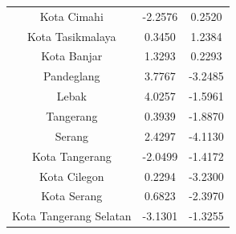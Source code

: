 \begin{longtable}{|c|c|c|}
Kota Cimahi & -2.2576 & 0.2520 \\
Kota Tasikmalaya & 0.3450 & 1.2384 \\
Kota Banjar & 1.3293 & 0.2293 \\
Pandeglang & 3.7767 & -3.2485 \\
Lebak & 4.0257 & -1.5961 \\
Tangerang & 0.3939 & -1.8870 \\
Serang & 2.4297 & -4.1130 \\
Kota Tangerang & -2.0499 & -1.4172 \\
Kota Cilegon & 0.2294 & -3.2300 \\
Kota Serang & 0.6823 & -2.3970 \\
Kota Tangerang Selatan & -3.1301 & -1.3255 \\
\hline
\end{longtable}